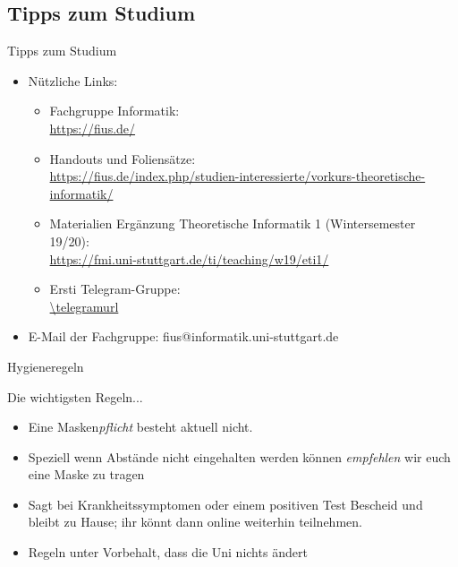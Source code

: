\subsection{Tipps zum Studium}
\begin{frame}[fragile]{Tipps zum Studium}
    \begin{itemize}
        \item Nützliche Links:\\
            \begin{itemize}
                \item Fachgruppe Informatik:\\
                \url{https://fius.de/}
                \item Handouts und Foliensätze:\\ \url{https://fius.de/index.php/studien-interessierte/vorkurs-theoretische-informatik/}
                \item Materialien Ergänzung Theoretische Informatik 1 (Wintersemester 19/20): \\
                \url{https://fmi.uni-stuttgart.de/ti/teaching/w19/eti1/}
                \item Ersti Telegram-Gruppe:\\
                \qrcode[hyperlink]{\telegramurl}
                 \url{\telegramurl}
        	\end{itemize}
        \item E-Mail der Fachgruppe: fius@informatik.uni-stuttgart.de

    \end{itemize}
\end{frame}

\begin{frame}[fragile]{Hygieneregeln}
	\begin{alertblock}{Die wichtigsten Regeln...}
		\begin{itemize}
			\item Eine Masken\emph{pflicht} besteht aktuell nicht.
            \item Speziell wenn Abstände nicht eingehalten werden können \emph{empfehlen} wir euch eine Maske zu tragen
			\item Sagt bei Krankheitssymptomen oder einem positiven Test Bescheid und bleibt zu Hause; ihr könnt dann online weiterhin teilnehmen.
			\item Regeln unter Vorbehalt, dass die Uni nichts ändert
		\end{itemize}
	\end{alertblock}
\end{frame}


